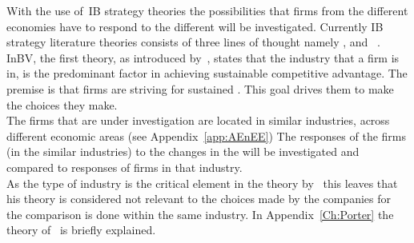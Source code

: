 
With the use of~\gls{IB} strategy theories the possibilities that firms from the different economies have to respond to the different \rr will be investigated.
Currently IB strategy literature theories consists of three lines of thought namely ,  and ~\cite{Peng:2009vt}.\\
\gls{InBV}, the first theory, as introduced by~\cite{Porter:1980to}, states that the industry that a firm is in, is the predominant factor in achieving sustainable competitive advantage. 
The premise is that firms are striving for sustained \ca. 
This goal drives them to make the choices they make.\\
The firms that are under investigation are located in similar industries, across different economic areas (see Appendix~\ref{app:AEnEE})
The responses of the firms (in the similar industries) to the changes in the \rr will be investigated and compared to responses of firms in that industry.\\
As the type of industry is the critical element in the theory by~\cite{Porter:1980to} this leaves that his theory is considered not relevant to the choices made by the companies for the comparison is done within the same industry.
In Appendix~\ref{Ch:Porter} the theory of~\cite{Porter:1980to} is briefly explained.

